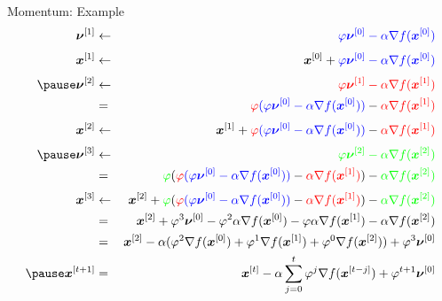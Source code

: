 \documentclass[11pt,compress,t,notes=noshow, xcolor=table]{beamer}
\begin{document}

\begin{frame}{Momentum: Example}
	\footnotesize 
	\begin{eqnarray*}
		\bm{\nu}^{[1]} &\leftarrow& \textcolor{blue}{\varphi \bm{\nu}^{[0]} - \alpha \nabla f(\bm{x}^{[0]})} \\[0.1cm]
		\bm{x}^{[1]} &\leftarrow& \bm{x}^{[0]} + \textcolor{blue}{\varphi \bm{\nu}^{[0]} - \alpha \nabla f(\bm{x}^{[0]})} \\[0.1cm]
		\pause
		\bm{\nu}^{[2]} &\leftarrow& \textcolor{red}{\varphi \bm{\nu}^{[1]} - \alpha \nabla f(\bm{x}^{[1]})} \\
		&=& \textcolor{red}{\varphi} \textcolor{blue}{(\varphi \bm{\nu}^{[0]} - \alpha \nabla f(\bm{x}^{[0]}))} - \textcolor{red}{\alpha \nabla f(\bm{x}^{[1]})} \\[0.1cm]
		\bm{x}^{[2]} &\leftarrow& \bm{x}^{[1]} +\textcolor{red}{\varphi} \textcolor{blue}{(\varphi \bm{\nu}^{[0]} - \alpha \nabla f(\bm{x}^{[0]}))} - \textcolor{red}{\alpha \nabla f(\bm{x}^{[1]})} \\[0.1cm]
		\pause
		\bm{\nu}^{[3]} &\leftarrow& \textcolor{green}{\varphi \bm{\nu}^{[2]} - \alpha \nabla f(\bm{x}^{[2]})} \\
		&=& \textcolor{green}{\varphi} (\textcolor{red}{\varphi} \textcolor{blue}{(\varphi \bm{\nu}^{[0]} - \alpha \nabla f(\bm{x}^{[0]}))} - \textcolor{red}{\alpha \nabla f(\bm{x}^{[1]})}) - \textcolor{green}{\alpha \nabla f(\bm{x}^{[2]})} \\[0.1cm]
		\bm{x}^{[3]} &\leftarrow& \bm{x}^{[2]} + \textcolor{green}{\varphi} (\textcolor{red}{\varphi} \textcolor{blue}{(\varphi \bm{\nu}^{[0]} - \alpha \nabla f(\bm{x}^{[0]}))} - \textcolor{red}{\alpha \nabla f(\bm{x}^{[1]})}) - \textcolor{green}{\alpha \nabla f(\bm{x}^{[2]})}  \\
		&=& \bm{x}^{[2]} + \varphi^3\bm{\nu}^{[0]} - \varphi^2\alpha\nabla f(\bm{x}^{[0]}) - \varphi \alpha \nabla f(\bm{x}^{[1]}) - \alpha \nabla f(\bm{x}^{[2]}) \\
		&=& \bm{x}^{[2]} - \alpha(\varphi^2 \nabla f(\bm{x}^{[0]}) + \varphi^1 \nabla f(\bm{x}^{[1]}) + \varphi^0 \nabla f(\bm{x}^{[2]})) + \varphi^3 \bm{\nu}^{[0]} \\
		\pause
		\bm{x}^{[t+1]} &=& \bm{x}^{[t]} - \alpha \displaystyle\sum_{j = 0}^{t} \varphi^j \nabla f(\bm{x}^{[t-j]}) + \varphi^{t+1}\bm{\nu}^{[0]}
	\end{eqnarray*}
	\end{frame}
\end{document}
